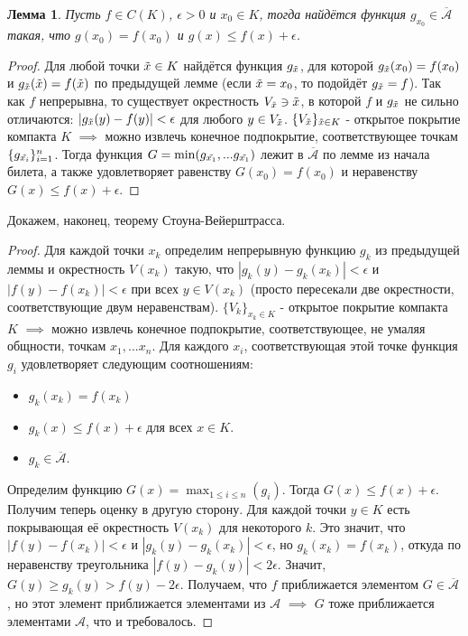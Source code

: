 \documentclass[a4paper]{article}
\theoremstyle{indented}
\newtheorem{lemma}{Лемма}
\theoremstyle{definition}
\theoremstyle{remark}
\begin{document}
\begin{lemma}
Пусть $f \in C(K)$, $\epsilon > 0$ и  $x_0 \in K$, тогда найдётся функция $g_{x_0} \in \overline{\mathcal{A}}$ такая, что $g(x_0)=f(x_0)$ и $g(x) \leq f(x)+\epsilon$.
\end{lemma}
\begin{proof}
    Для любой точки $\Tilde{x} \in K$ найдётся функция $g_{\Tilde{x}}$, для которой $g_{\Tilde{x}}(x_0)=f(x_0)$ и $g_{\Tilde{x}}(\Tilde{x})=f(\Tilde{x})$ по предыдущей лемме (если $\Tilde{x}=x_0$, то подойдёт $g_{\Tilde{x}}=f$). Так как $f$ непрерывна, то существует окрестность $V_{\Tilde{x}} \ni \Tilde{x}$, в которой $f$ и $g_{\Tilde{x}}$ не сильно отличаются: $|g_{\Tilde{x}}(y)-f(y)| < \epsilon$ для любого $y \in V_{\Tilde{x}}$. $\{V_{\Tilde{x}}\}_{\Tilde{x} \in K}$ - открытое покрытие компакта $K$ $\implies$ можно извлечь конечное подпокрытие, соответствующее точкам $\{g_{\Tilde{x_i}}\}_{i=1}^n$. Тогда функция $G=\min(g_{\Tilde{x_1}}, ... g_{\Tilde{x_1}})$ лежит в $\overline{\mathcal{A}}$ по лемме из начала билета, а также удовлетворяет равенству $G(x_0)=f(x_0)$ и неравенству $G(x) \leq f(x)+\epsilon$.
\end{proof}
Докажем, наконец, теорему Стоуна-Вейерштрасса. 
\begin{proof}
    Для каждой точки $x_k$ определим непрерывную функцию $g_k$ из предыдущей леммы и окрестность $V(x_k)$ такую, что $|g_k(y)-g_k(x_k)|<\epsilon$ и $|f(y)-f(x_k)|<\epsilon$ при всех $y \in V(x_k)$ (просто пересекали две окрестности, соответствующие двум неравенствам). $\{V_k\}_{x_k \in K}$ - открытое покрытие компакта $K$ $\implies$ можно извлечь конечное подпокрытие, соответствующее, не умаляя общности, точкам $x_1, ... x_n$. Для каждого $x_i$, соответствующая этой точке функция $g_i$ удовлетворяет следующим соотношениям:
    \begin{itemize}
        \item $g_k(x_k)=f(x_k)$
        \item $g_k(x) \leq f(x)+\epsilon$ для всех $x \in K$.
        \item $g_k \in \overline{\mathcal{A}}$.
    \end{itemize}

Определим функцию $G(x)=\max_{1 \leq i \leq n}(g_i)$. Тогда $G(x) \leq f(x)+\epsilon$. Получим теперь оценку в другую сторону. Для каждой точки $y \in K$ есть покрывающая её окрестность $V(x_k)$ для некоторого $k$. Это значит, что $|f(y)-f(x_k)|< \epsilon$ и $|g_k(y)-g_k(x_k)|<\epsilon$, но $g_k(x_k)=f(x_k)$, откуда по неравенству треугольника $|f(y)-g_k(y)|<2\epsilon$. Значит, $G(y) \geq g_k(y)>f(y)-2\epsilon$. Получаем, что $f$ приближается элементом $G \in \overline{\mathcal{A}}$, но этот элемент приближается элементами из $\mathcal{A}$ $\implies$ $G$ тоже приближается элементами $\mathcal{A}$, что и требовалось.
\end{proof}
\end{document}

